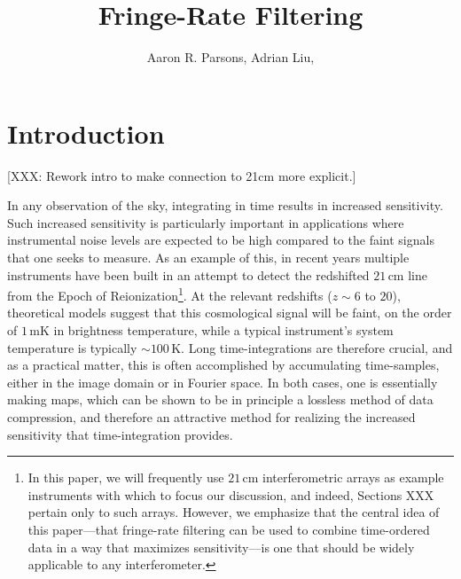 \documentclass[twocolumn,apj,numberedappendix]{emulateapj}
\begin{document}
\title{Fringe-Rate Filtering}

\author{
Aaron R. Parsons,
Adrian Liu,
}


\begin{abstract}
\end{abstract}





\section{Introduction}

[XXX: Rework intro to make connection to 21cm more explicit.]

In any observation of the sky, integrating in time results in increased sensitivity.  Such increased sensitivity is particularly important in applications where instrumental noise levels are expected to be high compared to the faint signals that one seeks to measure.  As an example of this, in recent years multiple instruments have been built in an attempt to detect the redshifted $21\,\textrm{cm}$ line from the Epoch of Reionization\footnote{In this paper, we will frequently use $21\,\textrm{cm}$ interferometric arrays as example instruments with which to focus our discussion, and indeed, Sections XXX pertain only to such arrays.  However, we emphasize that the central idea of this paper---that fringe-rate filtering can be used to combine time-ordered data in a way that maximizes sensitivity---is one that should be widely applicable to any interferometer.}.  At the relevant redshifts ($z\sim 6$ to $20$), theoretical models suggest that this cosmological signal will be faint, on the order of $1\,\textrm{mK}$ in brightness temperature, while a typical instrument's system temperature is typically $\sim 100\,\textrm{K}$.  Long time-integrations are therefore crucial, and as a practical matter, this is often accomplished by accumulating time-samples, either in the image domain or in Fourier space.  In both cases, one is essentially making maps, which can be shown to be in principle a lossless method of data compression, and therefore an attractive method for realizing the increased sensitivity that time-integration provides.
\end{document}

